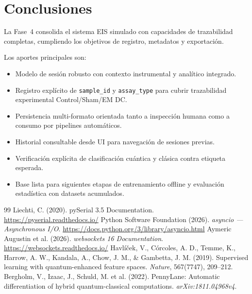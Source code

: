 \documentclass[11pt,a4paper,spanish]{book}
\begin{document}
\chapter{Conclusiones}

La Fase~4 consolida el sistema EIS simulado con capacidades de trazabilidad completas, cumpliendo los objetivos de registro, metadatos y exportaci\'{o}n.

Los aportes principales son:
\begin{itemize}
	\item Modelo de sesi\'{o}n robusto con contexto instrumental y anal\'{i}tico integrado.
	\item Registro expl\'{i}cito de \texttt{sample\_id} y \texttt{assay\_type} para cubrir trazabilidad experimental Control/Sham/EM DC.
	\item Persistencia multi-formato orientada tanto a inspecci\'{o}n humana como a consumo por pipelines autom\'{a}ticos.
	\item Historial consultable desde UI para navegaci\'{o}n de sesiones previas.
	\item Verificaci\'{o}n expl\'{i}cita de clasificaci\'{o}n cu\'{a}ntica y cl\'{a}sica contra etiqueta esperada.
	\item Base lista para siguientes etapas de entrenamiento offline y evaluaci\'{o}n estad\'{i}stica con datasets acumulados.
\end{itemize}

\begin{thebibliography}{99}
	 Liechti, C. (2020). pySerial 3.5 Documentation. \url{https://pyserial.readthedocs.io/}
	 Python Software Foundation (2026). \emph{asyncio --- Asynchronous I/O}. \url{https://docs.python.org/3/library/asyncio.html}
	 Aymeric Augustin et al. (2026). \emph{websockets 16 Documentation}. \url{https://websockets.readthedocs.io/}
	 Havl\'{i}\v{c}ek, V., C\'{o}rcoles, A. D., Temme, K., Harrow, A. W., Kandala, A., Chow, J. M., \& Gambetta, J. M. (2019). Supervised learning with quantum-enhanced feature spaces. \emph{Nature}, 567(7747), 209--212.
	 Bergholm, V., Izaac, J., Schuld, M. et al. (2022). PennyLane: Automatic differentiation of hybrid quantum-classical computations. \emph{arXiv:1811.04968v4}.
\end{thebibliography}
\end{document}

